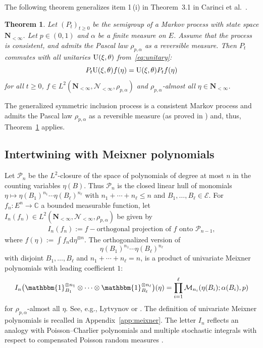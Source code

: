 \documentclass[10pt,a4paper]{amsart}
\numberwithin{equation}{section}
\newtheorem{Theorem}{Theorem}[section]
\newcommand{\C}{\mathbb{C}}
\newcommand{\dd}{\mathrm{d}} %
\newcommand{\1}{\mathbbm{1}}
\begin{document}
The following theorem generalizes item 1\,(i) in Theorem~3.1 in Carinci et al.~\cite{carinci2019orthogonal}.

\begin{Theorem} \label{thm:symmetry}
Let $(P_t)_{t\geq 0}$ be the semigroup of a Markov process with state space $\mathbf N_{<\infty}$. Let $p\in (0,1)$ and $\alpha$ be a finite measure on $E$. Assume that the process is consistent, and admits the Pascal law $\rho_{p,\alpha}$ as a reversible measure. Then $P_t$ commutes with all unitaries ${\rm U}(\xi,\theta)$ from~\eqref{eq:unitary}:
	\[
		P_t {\rm U}(\xi,\theta) f(\eta) = {\rm U}(\xi,\theta) P_t f (\eta)
	\]
	for all $t\geq 0$, $f\in L^2(\mathbf N_{<\infty},\mathcal N_{<\infty},\rho_{p,\alpha})$ and $\rho_{p,\alpha}$-almost all $\eta\in \mathbf N_{<\infty}$.
\end{Theorem}

The generalized symmetric inclusion process is a consistent Markov process and admits the Pascal law $\rho_{p,\alpha}$ as a reversible measure (as proved in \cite[Theorem~5.2.]{IntertwiningConsistent}) and, thus, Theorem~\ref{thm:symmetry} applies.

\subsection{Intertwining with Meixner polynomials}
Let $\mathcal P_n$ be the $L^2$-closure of the space of polynomials of degree at most $n$ in the counting variables $\eta(B)$. Thus $\mathcal P_n$ is the closed linear hull of monomials $\eta\mapsto \eta(B_1)^{n_1}\cdots \eta(B_\ell)^{n_\ell}$ with $n_1+\cdots + n_\ell \leq n$ and $B_1,\ldots, B_\ell \in \mathcal E$. For $f_n\colon E^n\to \C$ a bounded measurable function, let $I_n(f_n)\in L^2(\mathbf N_{<\infty},\mathcal N_{<\infty}, \rho_{p,\alpha})$ be given by
\begin{align*}
 I_n(f_n) := f - \text{orthogonal projection of } f \text{ onto } \mathcal P_{n-1},
\end{align*}
where $f(\eta) := \int f_n \dd \eta^{\otimes n}$.
The orthogonalized version of
\[
	\eta(B_1)^{n_1}\cdots \eta(B_\ell)^{n_\ell}
\]
with disjoint $B_1,\ldots, B_\ell$ and $n_1+\cdots+n_\ell =n$, is a product of univariate Meixner polynomials with leading coefficient $1$:
\begin{equation*} %
	I_n\bigl( \1_{B_1}^{\otimes n_1}\otimes \cdots \otimes \1_{B_\ell}^{\otimes n_\ell}\bigr) (\eta) = \prod_{i=1}^\ell \mathcal M_{n_i}(\eta(B_i);\alpha(B_i),p)
\end{equation*}
for $\rho_{p,\alpha}$-almost all $\eta$. See, e.g., Lytvynov \cite[Lemma 3.1]{lytvynov2003JFA} or \cite[Proposition~5.3]{IntertwiningConsistent}.
The definition of univariate Meixner polynomials is recalled in Appendix~\ref{app:meixner}. The letter $I_n$ reflects an analogy with Poisson--Charlier polynomials and multiple stochastic integrals with respect to compensated Poisson random measures \cite[Section 12]{LastPenroseLecturesOnThePoissonProcess}.
\end{document}
